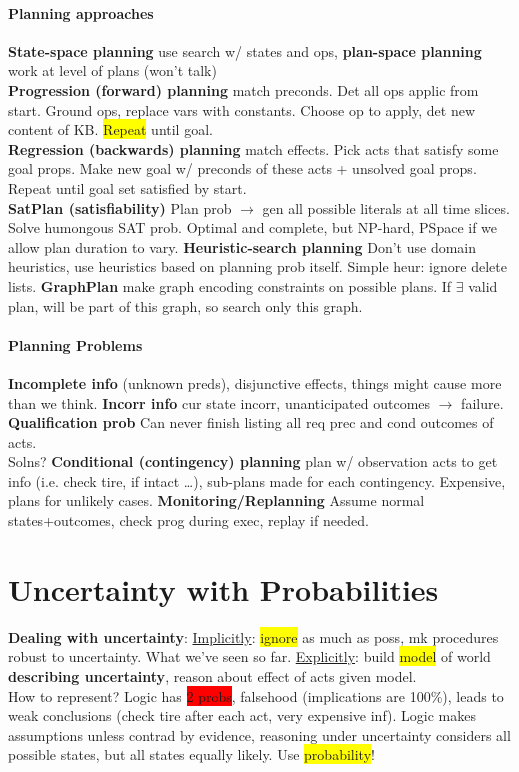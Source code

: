 \paragraph{Planning approaches}
\textbf{State-space planning} use search w/ states and ops,
\textbf{plan-space planning} work at level of plans (won't talk)
\\ \textbf{Progression (forward) planning} match preconds. Det all ops applic from
start. Ground ops, replace vars with constants. Choose op to apply,
det new content of KB. \colorbox{yellow}{Repeat} until goal.
\\ \textbf{Regression (backwards) planning} match effects. Pick acts that satisfy
some goal props. Make new goal w/ preconds of these acts + unsolved
goal props. Repeat until goal set satisfied by start.
\\ \textbf{SatPlan (satisfiability)} Plan prob $\to$ gen all possible literals at all
time slices. Solve humongous SAT prob. Optimal and complete, but
NP-hard, PSpace if we allow plan duration to
vary. \textbf{Heuristic-search planning} Don't use domain heuristics,
use heuristics based on planning prob itself. Simple heur: ignore
delete lists. \textbf{GraphPlan} make graph encoding constraints on
possible plans. If $\exists$ valid plan, will be part of this graph,
so search only this graph.
\paragraph{Planning Problems} \textbf{Incomplete info} (unknown preds),
disjunctive effects, things might cause more than we
think. \textbf{Incorr info} cur state incorr, unanticipated outcomes
$\to$ failure. \textbf{Qualification prob} Can never finish listing
all req prec and cond outcomes of acts.
\\ Solns? \textbf{Conditional (contingency) planning} plan w/
observation acts to get info (i.e. check tire, if intact \ldots),
sub-plans made for each contingency. Expensive, plans for unlikely
cases. \textbf{Monitoring/Replanning} Assume normal states+outcomes,
check prog during exec, replay if needed.
\color[HTML]{45b9f2}
\section{Uncertainty with Probabilities}
\textbf{Dealing with uncertainty}: \underline{Implicitly}: \colorbox{yellow}{ignore} as much
as poss, mk procedures robust to uncertainty. What we've seen so
far. \underline{Explicitly}: build \colorbox{yellow}{model} of world
\textbf{describing uncertainty}, reason about effect of acts given
model.
\\ How to represent? Logic has \colorbox{red}{2 probs}, falsehood
(implications are 100\%), leads to weak conclusions (check tire after
each act, very expensive inf). Logic makes assumptions unless contrad
by evidence, reasoning under uncertainty considers all possible
states, but all states equally likely. Use
\colorbox{yellow}{probability}!
